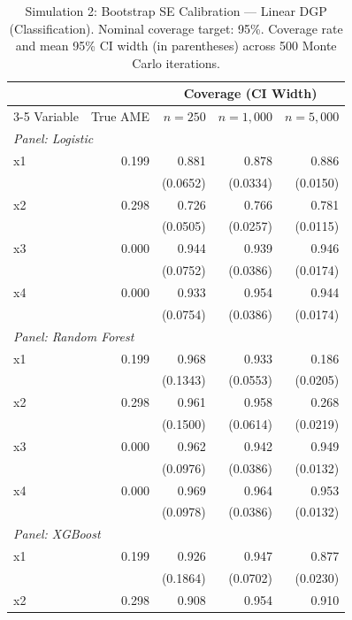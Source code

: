 \documentclass[12pt]{article}
\begin{document}
	\begin{table}[htbp]
		\centering
		\footnotesize
		\begin{threeparttable}
			\caption{Simulation 2: Bootstrap SE Calibration --- Linear DGP (Classification). Nominal coverage target: 95\%. Coverage rate and mean 95\% CI width (in parentheses) across 500 Monte Carlo iterations.}
			\label{tab:sim2_calibration_linear}
			\begin{tabular}{lrrrr}
				\toprule
				& & \multicolumn{3}{c}{Coverage (CI Width)} \\
				\cmidrule(lr){3-5}
				Variable & True AME & $n=250$ & $n=1,000$ & $n=5,000$ \\
				\midrule
				\multicolumn{5}{l}{\textit{Panel: Logistic}} \\
				\quad x1 & 0.199 & 0.881 & 0.878 & 0.886 \\
				&  & (0.0652) & (0.0334) & (0.0150) \\
				\quad x2 & 0.298 & 0.726 & 0.766 & 0.781 \\
				&  & (0.0505) & (0.0257) & (0.0115) \\
				\quad x3 & 0.000 & 0.944 & 0.939 & 0.946 \\
				&  & (0.0752) & (0.0386) & (0.0174) \\
				\quad x4 & 0.000 & 0.933 & 0.954 & 0.944 \\
				&  & (0.0754) & (0.0386) & (0.0174) \\
				\midrule
				\multicolumn{5}{l}{\textit{Panel: Random Forest}} \\
				\quad x1 & 0.199 & 0.968 & 0.933 & 0.186 \\
				&  & (0.1343) & (0.0553) & (0.0205) \\
				\quad x2 & 0.298 & 0.961 & 0.958 & 0.268 \\
				&  & (0.1500) & (0.0614) & (0.0219) \\
				\quad x3 & 0.000 & 0.962 & 0.942 & 0.949 \\
				&  & (0.0976) & (0.0386) & (0.0132) \\
				\quad x4 & 0.000 & 0.969 & 0.964 & 0.953 \\
				&  & (0.0978) & (0.0386) & (0.0132) \\
				\midrule
				\multicolumn{5}{l}{\textit{Panel: XGBoost}} \\
				\quad x1 & 0.199 & 0.926 & 0.947 & 0.877 \\
				&  & (0.1864) & (0.0702) & (0.0230) \\
				\quad x2 & 0.298 & 0.908 & 0.954 & 0.910 \\

\end{tabular}
\end{threeparttable}
\end{table}
\end{document}
